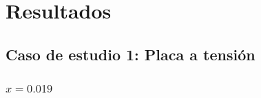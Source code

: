 \section{Resultados}
\label{sc:resultados}


\subsection{Caso de estudio 1: Placa a tensión}
	\subsubsection{\texorpdfstring{$x=0.019$}{x=0.019}}


